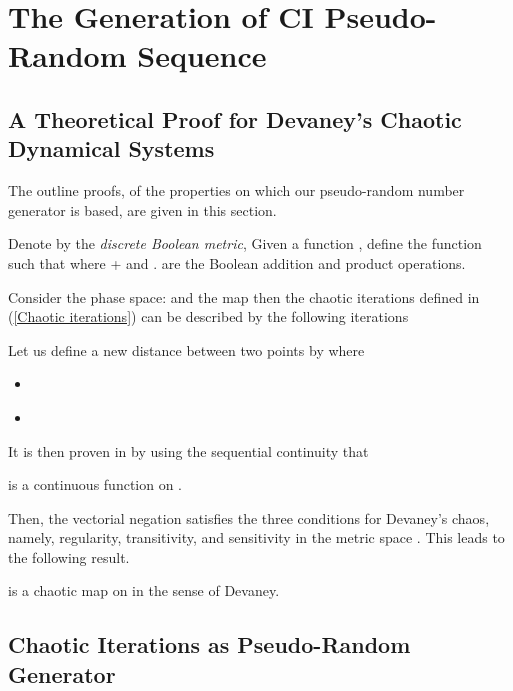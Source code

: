 \documentclass[journal]{IEEEtran}
\begin{document}
\section{The Generation of CI Pseudo-Random Sequence}
\label{The generation of pseudo-random sequence}


\subsection{A Theoretical Proof for Devaney's Chaotic Dynamical Systems}
\label{A theoretical proof for Devaney's chaotic dynamical systems}
The outline proofs, of the properties on which our pseudo-random number generator is based, are given in this section. 


Denote by  the \emph{discrete Boolean metric},  Given a function , define the function   such that  where + and . are the Boolean addition and product operations.

Consider the phase space:  and the map  then the chaotic iterations defined in (\ref{Chaotic iterations}) can be described by the following iterations \cite{guyeux09}


Let us define a new distance between two points  by  where
\begin{itemize}
\item  \\
\item 
\end{itemize}

\medskip

It is then proven in \cite{guyeux09} by using the sequential continuity that



\begin{proposition}
\label{continuite}  is a continuous function on .
\end{proposition}

Then, the vectorial negation  satisfies the three conditions for Devaney's chaos, namely, regularity, transitivity, and sensitivity in the metric space . This leads to the following result.



\begin{proposition}
 is a chaotic map on  in the sense of Devaney.
\end{proposition}




\subsection{Chaotic Iterations as Pseudo-Random Generator}
\end{document}

